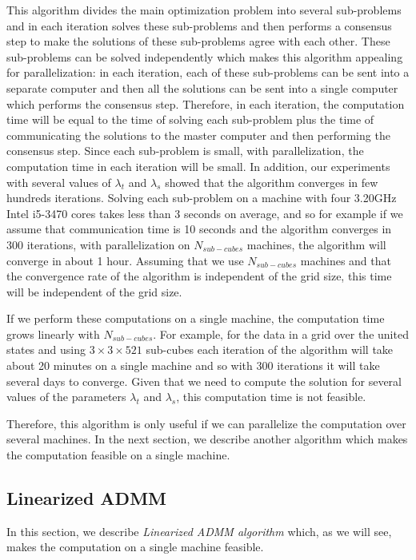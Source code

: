 \documentclass{article}
\begin{document}
This algorithm divides the main optimization problem into several sub-problems and in each iteration solves these sub-problems and then performs a consensus step to make the solutions of these sub-problems agree with each other. These sub-problems can be solved independently which makes this algorithm appealing for parallelization: in each iteration, each of these sub-problems can be sent into a separate computer and then all the solutions can be sent into a single computer which performs the consensus step. Therefore, in each iteration, the computation time will be equal to the time of solving each sub-problem plus the time of communicating the solutions to the master computer and then performing the consensus step. Since each sub-problem is small, with parallelization, the computation time in each iteration will be small. In addition, our experiments with several values of $\lambda_t$ and $\lambda_s$ showed that the algorithm converges in few hundreds iterations. Solving each sub-problem on a machine with four 3.20GHz Intel i5-3470 cores takes less than 3 seconds on average, and so for example if we assume that communication time is 10 seconds and the algorithm converges in 300 iterations, with parallelization on $N_{sub-cubes}$ machines, the algorithm will converge in about 1 hour. Assuming that we use $N_{sub-cubes}$ machines and that the convergence rate of the algorithm is independent of the grid size, this time will be independent of the grid size.

If we perform these computations on a single machine, the computation time grows linearly with $N_{sub-cubes}$. For example, for the data in a grid over the united states and using $3\times3\times521$ sub-cubes each iteration of the algorithm will take about 20 minutes on a single machine and so with 300 iterations it will take several days to converge. Given that we need to compute the solution for several values of the parameters $\lambda_t$ and $\lambda_s$, this computation time is not feasible.

Therefore, this algorithm is only useful if we can parallelize the computation over several machines. In the next section, we describe another algorithm which makes the computation feasible on a single machine.

\subsection{Linearized ADMM}
\label{sec:linADMM}

In this section, we describe \textit{Linearized ADMM algorithm} \citep{parikh_proximal_2014} which, as we will see, makes the computation on a single machine feasible.
\end{document}
